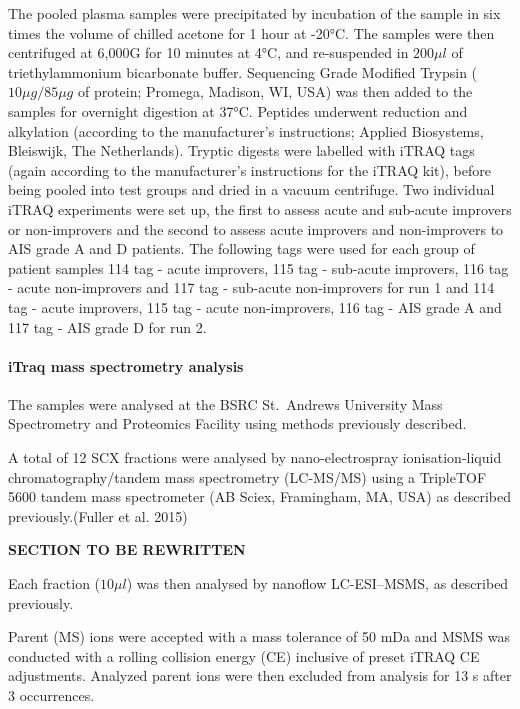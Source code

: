 \documentclass[9pt,lineno]{elife}
\begin{document}
The pooled plasma samples were precipitated by incubation of the sample in six times the volume of chilled acetone for 1 hour at -20°C.
The samples were then centrifuged at 6,000G for 10 minutes at 4°C, and re-suspended in \(200\mu l\) of triethylammonium bicarbonate buffer.
Sequencing Grade Modified Trypsin (\(10\mu g/85\mu g\) of protein; Promega, Madison, WI, USA) was then added to the samples for overnight digestion at 37°C.
Peptides underwent reduction and alkylation (according to the manufacturer's instructions; Applied Biosystems, Bleiswijk, The Netherlands).
Tryptic digests were labelled with iTRAQ tags (again according to the manufacturer's instructions for the iTRAQ kit), before being pooled into test groups and dried in a vacuum centrifuge.
Two individual iTRAQ experiments were set up, the first to assess acute and sub-acute improvers or non-improvers and the second to assess acute improvers and non-improvers to AIS grade A and D patients.
The following tags were used for each group of patient samples 114 tag - acute improvers, 115 tag - sub-acute improvers, 116 tag - acute non-improvers and 117 tag - sub-acute non-improvers for run 1 and 114 tag - acute improvers, 115 tag - acute non-improvers, 116 tag - AIS grade A and 117 tag - AIS grade D for run 2.

\hypertarget{itraq-mass-spectrometry-analysis}{%
\paragraph{iTraq mass spectrometry analysis}\label{itraq-mass-spectrometry-analysis}}

The samples were analysed at the BSRC St.~Andrews University Mass Spectrometry and Proteomics Facility using methods previously described.

A total of 12 SCX fractions were analysed by nano-electrospray ionisation-liquid chromatography/tandem mass spectrometry (LC-MS/MS) using a TripleTOF 5600 tandem mass spectrometer (AB Sciex, Framingham, MA, USA) as described previously.(Fuller et al. 2015)

\textbf{SECTION TO BE REWRITTEN}

Each fraction (\(10 \mu l\)) was then analysed by nanoflow LC-ESI--MSMS, as described previously.

Parent (MS) ions were accepted with a mass tolerance of 50 mDa and MSMS was conducted with a rolling collision energy (CE) inclusive of preset iTRAQ CE adjustments. Analyzed parent ions were then excluded from analysis for 13 s after 3 occurrences.
\end{document}
